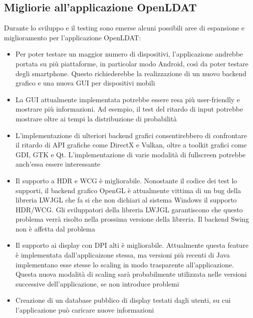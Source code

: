 \subsection{Migliorie all'applicazione OpenLDAT}
Durante lo sviluppo e il testing sono emerse alcuni possibili aree di espansione e miglioramento per l'applicazione OpenLDAT:\begin{itemize}
	\item Per poter testare un maggior numero di dispositivi, l'applicazione andrebbe portata su più piattaforme, in particolar modo Android, così da poter testare degli smartphone. Questo richiederebbe la realizzazione di un nuovo backend grafico e una nuova GUI per dispositivi mobili
	\item La GUI attualmente implementata potrebbe essere resa più user-friendly e mostrare più informazioni. Ad esempio, il test del ritardo di input potrebbe mostrare oltre ai tempi la distribuzione di probabilità
	\item L'implementazione di ulteriori backend grafici consentirebbero di confrontare il ritardo di API grafiche come DirectX e Vulkan, oltre a toolkit grafici come GDI, GTK e Qt. L'implementazione di varie modalità di fullscreen potrebbe anch'essa essere interessante
	\item Il supporto a HDR e WCG è migliorabile. Nonostante il codice dei test lo supporti, il backend grafico OpenGL è attualmente vittima di un bug della libreria LWJGL che fa si che non dichiari al sistema Windows il supporto HDR/WCG. Gli sviluppatori della libreria LWJGL garantiscono che questo problema verrà risolto nella prossima versione della libreria. Il backend Swing non è affetta dal problema
	\item Il supporto ai display con DPI alti è migliorabile. Attualmente questa feature è implementata dall'applicaizone stessa, ma versioni più recenti di Java implementano esse stesse lo scaling in modo trasparente all'applicazione. Questa nuova modalità di scaling sarà probabilmente utilizzata nelle versioni successive dell'applicazione, se non introduce problemi
	\item Creazione di un database pubblico di display testati dagli utenti, su cui l'applicazione può caricare nuove informazioni
\end{itemize}
